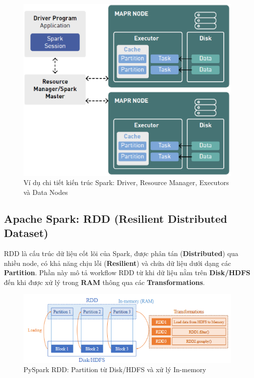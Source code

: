 \documentclass[11pt]{article}
\begin{document}
\begin{figure}[H]
    \centering
    \includegraphics[width=0.75\linewidth]{SparkSystemOverview.png}
    \caption{Ví dụ chi tiết kiến trúc Spark: Driver, Resource Manager, Executors và Data Nodes}
\end{figure}

\subsection{Apache Spark: RDD (Resilient Distributed Dataset)}
RDD là cấu trúc dữ liệu cốt lõi của Spark, được phân tán (\textbf{Distributed}) qua nhiều node, có khả năng chịu lỗi (\textbf{Resilient}) và chứa dữ liệu dưới dạng các \textbf{Partition}. Phần này mô tả workflow RDD từ khi dữ liệu nằm trên \textbf{Disk/HDFS} đến khi được xử lý trong \textbf{RAM} thông qua các \textbf{Transformations}.

\begin{figure}[H]
    \centering
    \includegraphics[width=0.9\linewidth]{pysparkRDD.png}
    \caption{PySpark RDD: Partition từ Disk/HDFS và xử lý In-memory}
\end{figure}
\end{document}
